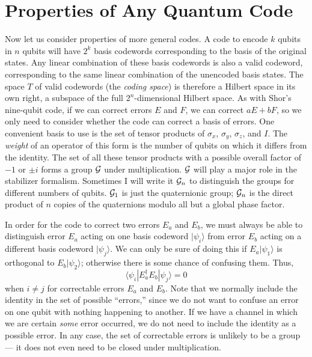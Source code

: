 \documentclass{report}
\newcommand{\G}{{\cal G}}
\newcommand{\ket}[1]{|{#1}\rangle}
\newcommand{\bra}[1]{\langle{#1}|}
\newcommand{\X}{\sigma_x}
\newcommand{\Z}{\sigma_z}
\newcommand{\Y}{\sigma_y}
\begin{document}
\section{Properties of Any Quantum Code}
\label{sec-general-prop}

Now let us consider properties of more general codes.  A code to encode 
$k$ qubits in $n$ qubits will have $2^k$ basis codewords corresponding to 
the basis of the original states.  Any linear combination of these basis 
codewords is also a valid codeword, corresponding to the same linear 
combination of the unencoded basis states.  The space $T$ of valid 
codewords (the {\em coding space}) is therefore a Hilbert space in its own 
right, a subspace of the full $2^n$-dimensional Hilbert space.  As with 
Shor's nine-qubit code, if we can correct errors $E$ and $F$, we can correct 
$aE + bF$, so we only need to consider whether the code can correct a basis of 
errors.  One convenient basis to use is the set of tensor products of $\X$, 
$\Y$, $\Z$, and $I$.  The {\em weight} of an operator of this form is the 
number of qubits on which it differs from the identity.  The set of all these 
tensor products with a possible overall factor of $-1$ or $\pm i$ forms a 
group $\G$ under multiplication.  $\G$ will play a major role in the 
stabilizer formalism.  Sometimes I will write it $\G_n$ to distinguish the 
groups for different numbers of qubits.  $\G_1$ is just the quaternionic 
group; $\G_n$ is the direct product of $n$ copies of the quaternions 
modulo all but a global phase factor.

In order for the code to correct two errors $E_a$ and $E_b$, we must 
always be able to distinguish error $E_a$ acting on one basis codeword 
$\ket{\psi_i}$ from error $E_b$ acting on a different basis codeword 
$\ket{\psi_j}$.  We can only be sure of doing this if $E_a \ket{\psi_1}$ is 
orthogonal to $E_b \ket{\psi_2}$; otherwise there is some chance of 
confusing them.  Thus,
\begin{equation}
\bra{\psi_i} E_a^\dagger E_b \ket{\psi_j} = 0
\label{eq-cond-orthogonal}
\end{equation}
when $i \neq j$ for correctable errors $E_a$ and $E_b$.  Note that we 
normally include the identity in the set of possible ``errors,'' since we do
not want to confuse an error on one qubit with nothing happening to another.  
If we have a channel in which we are certain {\em some} error occurred, 
we do not need to include the identity as a possible error.  In any case,
the set of correctable errors is unlikely to be a group --- it does not
even need to be closed under multiplication.
\end{document}
